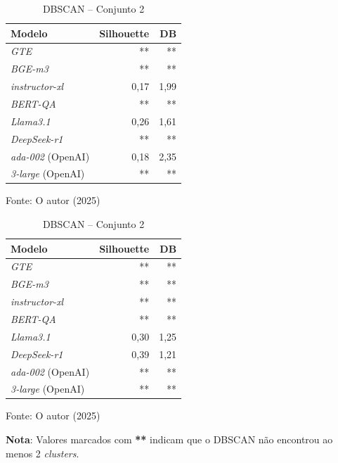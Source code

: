 \begin{table}[H]
    \begin{minipage}{0.48\textwidth}
        \caption{DBSCAN -- Conjunto 1}
        \centering
        \begin{tabular}{ l r r }
            \hline
            \textbf{Modelo} & \textbf{Silhouette} & \textbf{DB} \\  
            \hline
            \textit{GTE} & ** & ** \\
            \textit{BGE-m3} & ** & ** \\
            \textit{instructor-xl} & 0,17 & 1,99 \\
            \textit{BERT-QA} & ** & ** \\
            \textit{Llama3.1} & 0,26 & 1,61 \\
            \textit{DeepSeek-r1} & ** & ** \\
            \textit{ada-002} (OpenAI) & 0,18 & 2,35 \\
            \textit{3-large} (OpenAI) & ** & ** \\
            \hline
        \end{tabular}
        \vspace{2mm}
        \small Fonte: O autor (2025)
        \label{tab:dbscan-conjunto-documentos1-sem-reducao}
    \end{minipage}
    \hfill
    \begin{minipage}{0.48\textwidth}
        \caption{DBSCAN -- Conjunto 2}
        \centering
        \begin{tabular}{ l r r }
            \hline
            \textbf{Modelo} & \textbf{Silhouette} & \textbf{DB} \\  
            \hline
            \textit{GTE} & ** & ** \\
            \textit{BGE-m3} & ** & ** \\
            \textit{instructor-xl} & ** & ** \\
            \textit{BERT-QA} & ** & ** \\
            \textit{Llama3.1} & 0,30 & 1,25 \\
            \textit{DeepSeek-r1} & 0,39 & 1,21 \\
            \textit{ada-002} (OpenAI) & ** & ** \\
            \textit{3-large} (OpenAI) & ** & ** \\
            \hline
        \end{tabular}
        \vspace{2mm}
        \small Fonte: O autor (2025)
        \label{tab:dbscan-conjunto-documentos2-sem-reducao}
    \end{minipage}
    
    \vspace{-2mm}
    \begin{center}
        \small \textbf{Nota}: Valores marcados com \textbf{**} indicam que o DBSCAN não encontrou ao menos 2 \textit{clusters}.
    \end{center}
\end{table}

